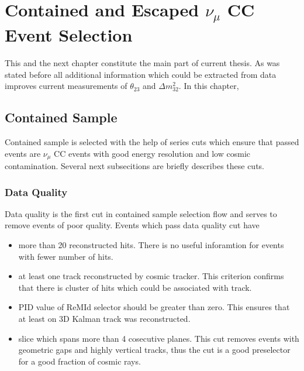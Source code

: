 \chapter{Contained and Escaped $\nu_\mu$ CC Event Selection}
\label{event_selection_chapter}

This and the next chapter constitute the main part of current thesis. As was stated before
all additional information which could be extracted from data improves current measurements 
of $\theta_{23}$ and $\Delta m_{32}^2$. In this chapter, 


\section{Contained Sample}
Contained sample is selected with the help of series cuts which ensure that passed events
are $\nu_\mu$ CC events with good energy resolution and low cosmic contamination. Several
next subsecitions are briefly describes these cuts.

\subsection{Data Quality}
Data quality is the first cut in contained sample selection flow and serves to remove
events of poor quality. Events which pass data quality cut have
\begin{itemize}
\item more than 20 reconstructed hits. There is no useful inforamtion for events with fewer 
number of hits.
\item at least one track reconstructed by cosmic tracker. This criterion confirms that there is
cluster of hits which could be associated with track.
\item PID value of ReMId selector should be greater than zero. This ensures that at least on 
3D Kalman track was reconstructed.
\item slice which spans more than 4 cosecutive planes. This cut removes events with geometric 
gaps and highly vertical tracks, thus the cut is a good preselector for a good fraction of 
cosmic rays.
\end{itemize}

